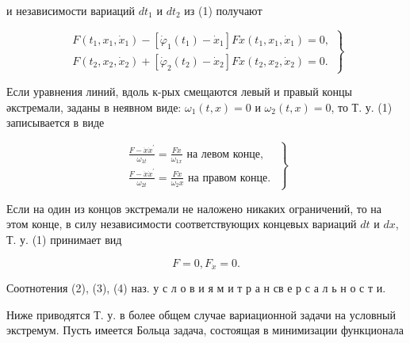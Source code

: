 \documentclass[10pt]{article}
\begin{document}
и независимости вариаций $d t_{1}$ и $d t_{2}$ из (1) получают



\[

\left.\begin{array}{l}

F\left(t_{1}, x_{1}, \dot{x}_{1}\right)-\left[\dot{\varphi}_{1}\left(t_{1}\right)-\dot{x}_{1}\right] F \dot{x}\left(t_{1}, x_{1}, \dot{x}_{1}\right)=0, \\

F\left(t_{2}, x_{2}, \dot{x}_{2}\right)+\left[\dot{\varphi}_{2}\left(t_{2}\right)-\dot{x}_{2}\right] F \dot{x}\left(t_{2}, x_{2}, \dot{x}_{2}\right)=0 .

\end{array}\right\}

\]



Если уравнения линий, вдоль к-рых смещаются левый и правый концы әкстремали, заданы в неявном виде: $\omega_{1}(t, x)=0$ и $\omega_{2}(t, x)=0$, то Т. у. (1) записывается в виде



\[

\left.\begin{array}{l}

\frac{F-\dot{x} \dot{x}^{\prime}}{\omega_{1 t}}=\frac{F \dot{x}}{\omega_{1 x}} \text { на левом конце, } \\

\frac{F-\dot{x} \dot{x}^{\prime}}{\omega_{2 t}}=\frac{F \dot{x}}{\omega_{2} x} \text { на правом конце. }

\end{array}\right\}

\]



Если на один из концов экстремали не наложено никаких ограничений, то на этом конце, в силу независимости соответствующих концевых вариаций $d t$ и $d x$, Т. у. (1) принимает вид



\[

F=0, F_{\dot{x}}=0 .

\]



Соотнотения (2), (3), (4) наз. у с л о в и я м и т р а н св е р с а л ь н о с т и.



Ниже приводятся Т. у. в более общем случае вариационной задачи на условный экстремум. Пусть имеется Больца задача, состоящая в минимизации функционала
\end{document}
